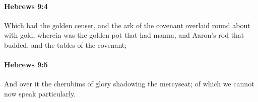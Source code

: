 		\paragraph{Hebrews 9:4} %
			\label{HEBREWS-9-4}

			Which had the golden censer, and the ark of the covenant overlaid round about with gold, wherein was the golden pot that had manna, and Aaron's rod that budded, and the tables of the covenant;

			\begin{framed}
			\scriptsize
				\begin{compactdesc}
					\item[SBLG] 
				\end{compactdesc}
			\end{framed}

		\paragraph{Hebrews 9:5} %
			\label{HEBREWS-9-5}

			And over it the cherubims of glory shadowing the mercyseat; of which we cannot now speak particularly.

